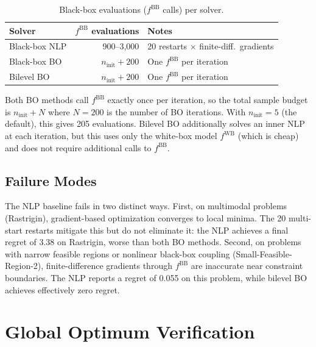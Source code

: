 \documentclass[12pt,a4paper]{article}%
\theoremstyle{plain}%
\theoremstyle{remark}%
\theoremstyle{definition}%
\def\WB{\mathrm{WB}}
\def\BB{\mathrm{BB}}
\begin{document}
\begin{appendices}
\begin{table}[htbp]
\centering
\caption{Black-box evaluations ($f^{\BB}$ calls) per solver.}
\label{tab:sample_efficiency}
\begin{tabular}{@{}lrl@{}}
\toprule
\textbf{Solver} & \textbf{$f^{\BB}$ evaluations} & \textbf{Notes} \\
\midrule
Black-box NLP & 900--3{,}000 & 20 restarts $\times$ finite-diff.\ gradients \\
Black-box BO & $n_\text{init} + 200$ & One $f^{\BB}$ per iteration \\
Bilevel BO & $n_\text{init} + 200$ & One $f^{\BB}$ per iteration \\
\bottomrule
\end{tabular}
\end{table}

Both BO methods call $f^{\BB}$ exactly once per iteration, so the total sample budget is $n_\text{init} + N$ where $N=200$ is the number of BO iterations. With $n_\text{init} = 5$ (the default), this gives 205 evaluations. Bilevel BO additionally solves an inner NLP at each iteration, but this uses only the white-box model $f^{\WB}$ (which is cheap) and does not require additional calls to $f^{\BB}$.

\subsection{Failure Modes}\label{subsec:nlp_failures}

The NLP baseline fails in two distinct ways. First, on multimodal problems (Rastrigin), gradient-based optimization converges to local minima. The 20 multi-start restarts mitigate this but do not eliminate it: the NLP achieves a final regret of 3.38 on Rastrigin, worse than both BO methods. Second, on problems with narrow feasible regions or nonlinear black-box coupling (Small-Feasible-Region-2), finite-difference gradients through $f^{\BB}$ are inaccurate near constraint boundaries. The NLP reports a regret of 0.055 on this problem, while bilevel BO achieves effectively zero regret.

\section{Global Optimum Verification}\label{sec:optimum_verification}


\end{appendices}
\end{document}
